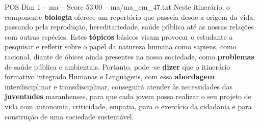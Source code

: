 \begin{textsample}{POS Dim 1 – ma – Score 53.00 – ma/ma\_em\_47.txt}
Neste itinerário, o componente \textbf{biologia} oferece um repertório que passeia desde a origem da vida, passando pela reprodução, hereditariedade, saúde pública até as nossas relações com outras espécies.
Estes \textbf{tópicos} básicos visam provocar o estudante a pesquisar e refletir sobre o papel da natureza humana como sapiens, como racional, diante de óbices ainda presentes na nossa sociedade, como \textbf{problemas} de saúde pública e ambientais.
Portanto, pode -se \textbf{dizer} que o itinerário formativo integrado Humanas e Linguagens, com essa \textbf{abordagem} interdisciplinar e transdisciplinar, conseguirá atender às necessidades das \textbf{juventudes} maranhenses, para que cada jovem possa realizar o seu projeto de vida com autonomia, criticidade, empatia, para o exercício da cidadania e para construção de uma sociedade sustentável.

\end{textsample}
